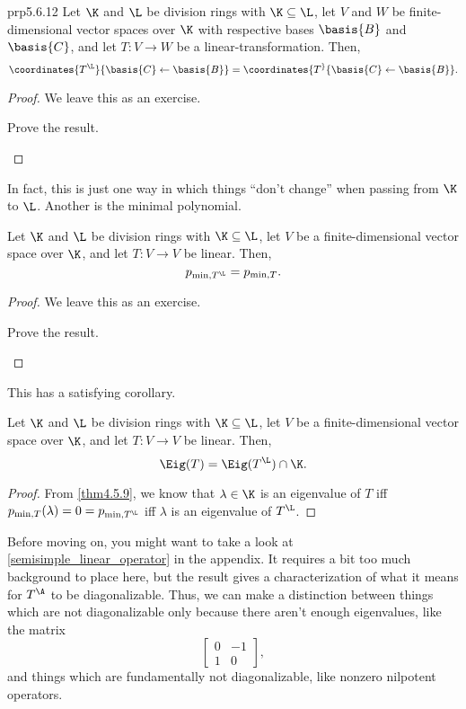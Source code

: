 \begin{prp}{}{prp5.6.12}
	Let $\K$ and $\L$ be division rings with $\K \subseteq \L$, let $V$ and $W$ be finite-dimensional vector spaces over $\K$ with respective bases $\basis{B}$ and $\basis{C}$, and let $T\colon V\rightarrow W$ be a linear-transformation.  Then,
	\begin{equation}
		\coordinates{T^{\L}}{\basis{C}\leftarrow \basis{B}}=\coordinates{T^}{\basis{C}\leftarrow \basis{B}}.
	\end{equation}
	\begin{proof}
		We leave this as an exercise.
		\begin{exr}[breakable=false]{}{}
			Prove the result.
		\end{exr}
	\end{proof}
\end{prp}
In fact, this is just one way in which things ``don't change'' when passing from $\K$ to $\L$.  Another is the minimal polynomial.
\begin{prp}{}{}
	Let $\K$ and $\L$ be division rings with $\K \subseteq \L$, let $V$ be a finite-dimensional vector space over $\K$, and let $T\colon V\rightarrow V$ be linear.  Then,
	\begin{equation}
		p_{\min ,T^{\L}}=p_{\min ,T}.
	\end{equation}
	\begin{proof}
		We leave this as an exercise.
		\begin{exr}[breakable=false]{}{}
			Prove the result.
		\end{exr}
	\end{proof}
\end{prp}
This has a satisfying corollary.
\begin{crl}{}{}
	Let $\K$ and $\L$ be division rings with $\K \subseteq \L$, let $V$ be a finite-dimensional vector space over $\K$, and let $T\colon V\rightarrow V$ be linear.  Then,
	\begin{equation}
		\Eig (T)=\Eig (T^{\L})\cap \K.
	\end{equation}
	\begin{proof}
		From \cref{thm4.5.9}, we know that $\lambda \in \K$ is an eigenvalue of $T$ iff $p_{\min ,T}(\lambda )=0=p_{\min ,T^{\L}}$ iff $\lambda$ is an eigenvalue of $T^{\L}$.
	\end{proof}
\end{crl}

\horizontalrule

Before moving on, you might want to take a look at \cref{semisimple_linear_operator} in the appendix.  It requires a bit too much background to place here, but the result gives a characterization of what it means for $T^{\A}$ to be diagonalizable.  Thus, we can make a distinction between things which are not diagonalizable only because there aren't enough eigenvalues, like the matrix
\begin{equation}
	\begin{bmatrix}0 & -1 \\ 1 & 0\end{bmatrix},
\end{equation}
and things which are fundamentally not diagonalizable, like nonzero nilpotent operators.

